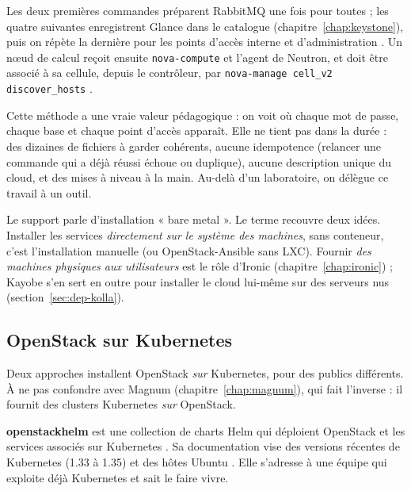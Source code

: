 Les deux premières commandes préparent RabbitMQ une fois pour toutes \parencite{install-messaging-ubuntu} ; les quatre suivantes
enregistrent Glance dans le catalogue (chapitre~\ref{chap:keystone}), puis on répète la dernière pour les points d'accès interne et
d'administration \parencite{glance-install}. Un nœud de calcul reçoit ensuite \texttt{nova-compute} et l'agent de Neutron, et doit être
associé à sa cellule, depuis le contrôleur, par \texttt{nova-manage cell\_v2 discover\_hosts} \parencite{nova-install-compute}.

Cette méthode a une vraie valeur pédagogique : on voit où chaque mot de passe, chaque base et chaque point d'accès apparaît. Elle ne
tient pas dans la durée : des dizaines de fichiers à garder cohérents, aucune idempotence (relancer une commande qui a déjà réussi
échoue ou duplique), aucune description unique du cloud, et des mises à niveau à la main. Au-delà d'un laboratoire, on délègue ce
travail à un outil.

\begin{remarque}
Le support parle d'installation « bare metal ». Le terme recouvre deux idées. Installer les services \emph{directement sur le
système des machines}, sans conteneur, c'est l'installation manuelle (ou OpenStack-Ansible sans LXC). Fournir \emph{des machines
physiques aux utilisateurs} est le rôle d'Ironic (chapitre~\ref{chap:ironic}) ; Kayobe s'en sert en outre pour installer le cloud lui-même
sur des serveurs nus (section~\ref{sec:dep-kolla}).
\end{remarque}

\subsection{OpenStack sur Kubernetes}\label{sec:dep-autres}

Deux approches installent OpenStack \emph{sur} Kubernetes, pour des publics différents. À ne pas confondre avec Magnum
(chapitre~\ref{chap:magnum}), qui fait l'inverse : il fournit des clusters Kubernetes \emph{sur} OpenStack.

\textbf{\gls{openstackhelm}} est une collection de charts Helm qui déploient OpenStack et les services associés sur Kubernetes
\parencite{helm-index,helm-readme}. Sa documentation vise des versions récentes de Kubernetes (1.33 à 1.35) et des hôtes Ubuntu
\parencite{helm-readme}. Elle s'adresse à une équipe qui exploite déjà Kubernetes et sait le faire vivre.

